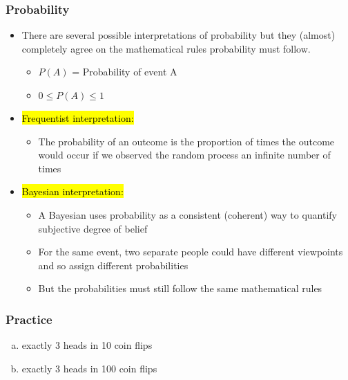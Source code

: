 \documentclass[slidestop,compress,mathserif]{beamer}
\begin{document}

\begin{frame}
\frametitle{Probability}

\begin{itemize}

    \item There are several possible interpretations of probability but they (almost) completely agree on the mathematical rules probability must follow.
    \begin{itemize}
        \item $P(A)$ = Probability of event A 
        \item $0 \le P(A) \le 1$
    \end{itemize}

    \pause

    \item \hl{Frequentist interpretation:} 
    \begin{itemize}
        \item The probability of an outcome is the proportion of times the outcome would occur if we observed the random process an infinite number of times
    \end{itemize}

    \pause

    \item \hl{Bayesian interpretation:} 
    \begin{itemize}
        \item A Bayesian uses probability as a consistent (coherent) way to quantify subjective degree of belief
        \item For the same event, two separate people could have different viewpoints and so assign different probabilities
        \item But the probabilities must still follow the same mathematical rules
    \end{itemize}
\end{itemize}

\end{frame}


\begin{frame}
\frametitle{Practice}


\begin{enumerate}[(a)]
\item exactly 3 heads in 10 coin flips
\item exactly 3 heads in 100 coin flips
\end{enumerate}

\end{frame}
\end{document}
